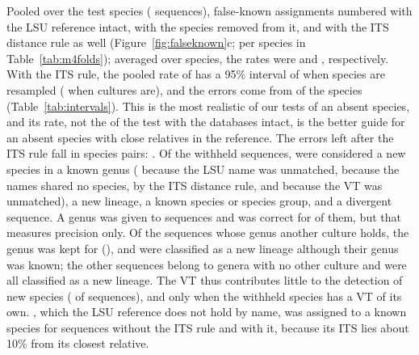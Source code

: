 \documentclass[11pt]{article}
\newcommand{\spn}[1]{\emph{#1}}   %
\begin{document}
Pooled over the \MfourFolds{} test species (\MfourHeldN{} sequences), false-known assignments numbered
\MfourControlFKvOne{} with the LSU reference intact, \MfourFKvOne{} with the species removed from it, and
\MfourFKvTwo{} with the ITS distance rule as well (Figure~\ref{fig:falseknown}c; per species in
Table~\ref{tab:m4folds}); averaged over species, the rates were \MfourFKvOneSpeciesMacro{} and
\MfourFKvTwoSpeciesMacro{}, respectively. With the ITS rule, the pooled rate of \MfourFKvTwoPct{} has a 95\% interval
of \CiMfourVTwoSp{} when species are resampled (\CiMfourVTwoCu{} when cultures are), and the errors come from
\CiMfourVTwoSpN{} of the \MfourFolds{} species (Table~\ref{tab:intervals}). This is the most realistic of our tests of an absent species, and its rate, not the
\FKITSPct{} of the test with the databases intact, is the better guide for an absent species with close relatives
in the reference. The \MfourFKvTwo{} errors left after the ITS rule fall in \MfourRemainingPairs{} species pairs:
\MfourRemaining{}. Of the \MfourHeldN{} withheld sequences, \MfourNovelSpecies{} were considered a new species in a
known genus (\MfourNTwo{} because the LSU name was unmatched, \MfourNThree{} because the names shared no species,
\MfourNSix{} by the ITS distance rule, and \MfourNOne{} because the VT was unmatched), \MfourNovelLineage{} a new
lineage, \MfourKnownCalls{} a known species or species group, and \MfourOtherCalls{} a divergent sequence. A genus
was given to \MfourGenusCalled{} sequences and was correct for \MfourGenusCompatible{} of them, but that measures
precision only. Of the \GenusRepN{} sequences whose genus another culture holds, the genus was kept for
\GenusRepRight{} (\GenusRecallPct{}), and \GenusRepLost{} were classified as a new lineage although their genus was
known; the other \GenusUnrepN{} sequences belong to genera with no other culture and were all classified as a new
lineage. The VT thus contributes little to the detection of new species (\MfourNOnePct{} of sequences), and only when
the withheld species has a VT of its own. \spn{\MfourAbsentTarget}, which the LSU reference does not hold by name,
was assigned to a known species for \MfourAbsentFK{} sequences without the ITS rule and \MfourAbsentFKvTwo{} with it,
because its ITS lies about 10\% from its closest relative.\MfourComplete{}

\end{document}
